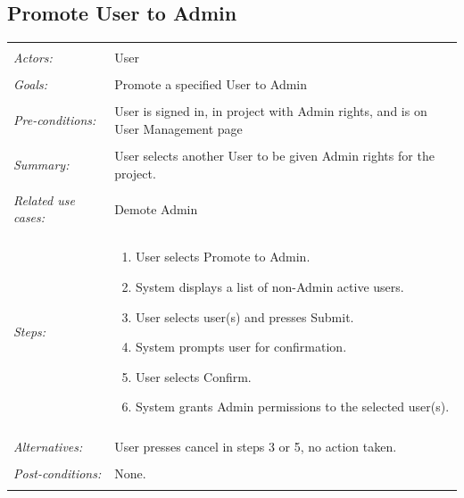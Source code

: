 \documentclass[11pt]{report}
\begin{document}
\subsection{Promote User to Admin}
\begin{tabular}{ p{2cm} p{12cm} }
    \hline
    \\
    \textit{Actors:} & User \\ 
    \\
    \textit{Goals:} & Promote a specified User to Admin \\
    \\
    \textit{Pre-conditions:} & User is signed in, in project with Admin rights, and is on User Management page \\
    \\
    \textit{Summary:} & User selects another User to be given Admin rights for the project. \\ 
    \\
    \textit{Related use cases:} & Demote Admin \\ 
    \\
    \textit{Steps:} & \begin{enumerate}
        \item User selects Promote to Admin.
        \item System displays a list of non-Admin active users.
        \item User selects user(s) and presses Submit.
        \item System prompts user for confirmation.
        \item User selects Confirm.
        \item System grants Admin permissions to the selected user(s).
    \end{enumerate} \\
    \\
    \textit{Alternatives:} & User presses cancel in steps 3 or 5, no action taken. \\
    \\
    \textit{Post-conditions:} & None. \\
    \\
    \hline
\end{tabular}
\end{document}
